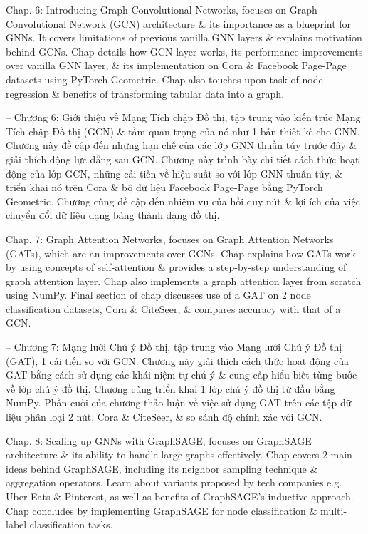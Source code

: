 \documentclass{article}
\begin{document}
\begin{itemize}
\begin{itemize}
        Chap. 6: Introducing Graph Convolutional Networks, focuses on Graph Convolutional Network (GCN) architecture \& its importance as a blueprint for GNNs. It covers limitations of previous vanilla GNN layers \& explains motivation behind GCNs. Chap details how GCN layer works, its performance improvements over vanilla GNN layer, \& its implementation on Cora \& Facebook Page-Page datasets using PyTorch Geometric. Chap also touches upon task of node regression \& benefits of transforming tabular data into a graph.

        -- Chương 6: Giới thiệu về Mạng Tích chập Đồ thị, tập trung vào kiến trúc Mạng Tích chập Đồ thị (GCN) \& tầm quan trọng của nó như 1 bản thiết kế cho GNN. Chương này đề cập đến những hạn chế của các lớp GNN thuần túy trước đây \& giải thích động lực đằng sau GCN. Chương này trình bày chi tiết cách thức hoạt động của lớp GCN, những cải tiến về hiệu suất so với lớp GNN thuần túy, \& triển khai nó trên Cora \& bộ dữ liệu Facebook Page-Page bằng PyTorch Geometric. Chương cũng đề cập đến nhiệm vụ của hồi quy nút \& lợi ích của việc chuyển đổi dữ liệu dạng bảng thành dạng đồ thị.

        Chap. 7: Graph Attention Networks, focuses on Graph Attention Networks (GATs), which are an improvements over GCNs. Chap explains how GATs work by using concepts of self-attention \& provides a step-by-step understanding of graph attention layer. Chap also implements a graph attention layer from scratch using NumPy. Final section of chap discusses use of a GAT on 2 node classification datasets, Cora \& CiteSeer, \& compares accuracy with that of a GCN.

        -- Chương 7: Mạng lưới Chú ý Đồ thị, tập trung vào Mạng lưới Chú ý Đồ thị (GAT), 1 cải tiến so với GCN. Chương này giải thích cách thức hoạt động của GAT bằng cách sử dụng các khái niệm tự chú ý \& cung cấp hiểu biết từng bước về lớp chú ý đồ thị. Chương cũng triển khai 1 lớp chú ý đồ thị từ đầu bằng NumPy. Phần cuối của chương thảo luận về việc sử dụng GAT trên các tập dữ liệu phân loại 2 nút, Cora \& CiteSeer, \& so sánh độ chính xác với GCN.

        Chap. 8: Scaling up GNNs with GraphSAGE, focuses on GraphSAGE architecture \& its ability to handle large graphs effectively. Chap covers 2 main ideas behind GraphSAGE, including its neighbor sampling technique \& aggregation operators. Learn about variants proposed by tech companies e.g. Uber Eats \& Pinterest, as well as benefits of GraphSAGE's inductive approach. Chap concludes by implementing GraphSAGE for node classification \& multi-label classification tasks.


\end{itemize}
\end{itemize}
\end{document}
